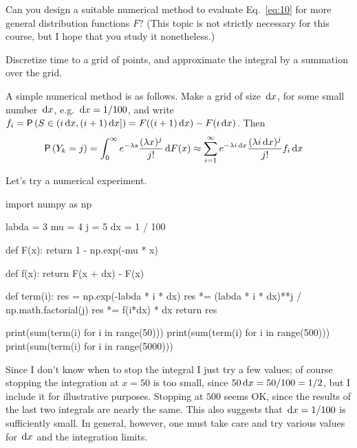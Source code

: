 \begin{exercise}
  Can you design a suitable numerical method to evaluate   Eq.~\eqref{eq:10} for more 
  general distribution functions $F$? (This topic is not strictly necessary for this course, but I hope that you study it nonetheless.)
\begin{hint}
Discretize time to  a grid of points, and   approximate the integral by a summation over the grid.
\end{hint}
  \begin{solution}
  A simple numerical method is as follows. Make a grid of
  size $\,\text{d}x$, for some small number $\,\text{d}x$, e.g. $\,\text{d}x=1/100$, and write
  $f_i = \P{S\in(i\d x, (i+1)\d x]} = F((i+1)\d x) - F(i\d x)$. Then 
  \begin{equation*}
    \begin{split}
  \P{Y_k = j} 
&= \int_0^\infty e^{-\lambda s}\frac{(\lambda x)^j}{j!} \d F(x) 
\approx \sum_{i=1}^\infty e^{-\lambda i \d x}\frac{(\lambda i\d x)^j}{j!} f_i \d x
    \end{split}
\end{equation*}

Let's try a numerical experiment. 

\begin{pyconsole}
import numpy as np

labda = 3
mu = 4
j = 5
dx = 1 / 100


def F(x):
    return 1 - np.exp(-mu * x)


def f(x):
    return F(x + dx) - F(x)


def term(i):
    res = np.exp(-labda * i * dx)
    res *= (labda * i * dx)**j / np.math.factorial(j)
    res *= f(i*dx) * dx
    return res

\end{pyconsole}

\begin{pyconsole}
print(sum(term(i) for i in range(50)))
print(sum(term(i) for i in range(500)))
print(sum(term(i) for i in range(5000)))
\end{pyconsole}

Since I don't know when to stop the integral I just try a few values;
of course stopping the integration at $x=50$ is too small, since
$50\,\text{d}x=50/100=1/2$, but I include it for illustrative
purposes. Stopping at $500$ seems OK, since the results of the last
two integrals are nearly the same. This also suggests that
$\,\text{d}x=1/100$ is sufficiently small. In general, however, one must take
care and try various values for $\,\text{d}x$ and the integration limits.



\end{solution}
\end{exercise}
